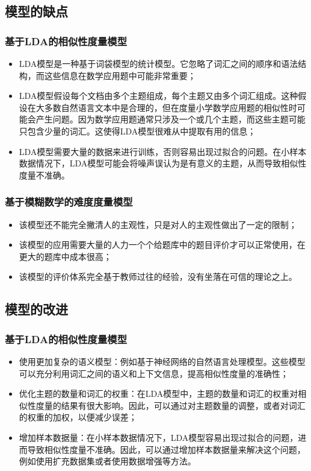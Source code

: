 \subsection{模型的缺点}

\subsubsection{基于LDA的相似性度量模型}

\begin{itemize}
    \item LDA模型是一种基于词袋模型的统计模型。它忽略了词汇之间的顺序和语法结构，而这些信息在数学应用题中可能非常重要；
    \item LDA模型假设每个文档由多个主题组成，每个主题又由多个词汇组成。这种假设在大多数自然语言文本中是合理的，但在度量小学数学应用题的相似性时可能会产生问题。因为数学应用题通常只涉及一个或几个主题，而这些主题可能只包含少量的词汇。这使得LDA模型很难从中提取有用的信息；
    \item LDA模型需要大量的数据来进行训练，否则容易出现过拟合的问题。在小样本数据情况下，LDA模型可能会将噪声误认为是有意义的主题，从而导致相似性度量不准确。
\end{itemize}

\subsubsection{基于模糊数学的难度度量模型}

\begin{itemize}
    \item 该模型还不能完全撇清人的主观性，只是对人的主观性做出了一定的限制；
    \item 该模型的应用需要大量的人力一个个给题库中的题目评价才可以正常使用，在更大的题库中成本很高；
    \item 该模型的评价体系完全基于教师过往的经验，没有坐落在可信的理论之上。
\end{itemize}

\subsection{模型的改进}

\subsubsection{基于LDA的相似性度量模型}

\begin{itemize}
    \item 使用更加复杂的语义模型：例如基于神经网络的自然语言处理模型。这些模型可以充分利用词汇之间的语义和上下文信息，提高相似性度量的准确性；
    \item 优化主题的数量和词汇的权重：在LDA模型中，主题的数量和词汇的权重对相似性度量的结果有很大影响。因此，可以通过对主题数量的调整，或者对词汇的权重的加权，以便减少误差；
    \item 增加样本数据量：在小样本数据情况下，LDA模型容易出现过拟合的问题，进而导致相似性度量不准确。因此，可以通过增加样本数据量来解决这个问题，例如使用扩充数据集或者使用数据增强等方法。
\end{itemize}

